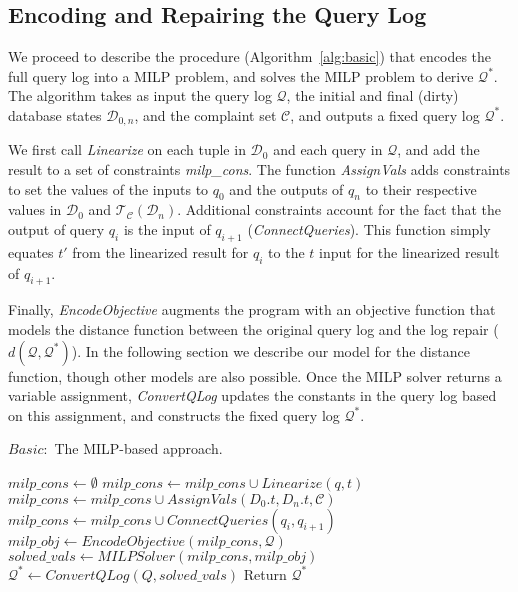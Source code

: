 \subsection{Encoding and Repairing the Query Log}
\label{sec:milp}

We proceed to describe the procedure (Algorithm~\ref{alg:basic}) that encodes 
the full query log into a MILP problem, and solves the MILP problem to derive $\mathcal{Q}^*$.
The algorithm takes as input the query log $\mathcal{Q}$, 
the initial and final (dirty) database states 
$\mathcal{D}_{0, n}$, and the complaint set $\mathcal{C}$, and outputs a fixed query 
log $\mathcal{Q}^*$.  

We first call \textit{Linearize} on each tuple in $\mathcal{D}_0$ and
each query in $\mathcal{Q}$, and add the result to a set of
constraints \textit{milp\_cons}. The function \textit{AssignVals} adds
constraints to set the values of the inputs to $q_0$ and the outputs
of $q_n$ to their respective values in $\mathcal{D}_0$ and
$\mathcal{T}_\mathcal{C}(\mathcal{D}_n)$. Additional constraints
account for the fact that the output of query $q_i$ is the input of
$q_{i+1}$ (\textit{ConnectQueries}). This function simply equates $t'$
from the linearized result for $q_i$ to the $t$ input for the
linearized result of $q_{i+1}$.

Finally, \emph{EncodeObjective} augments the program with an objective
function that models the distance function between the original query
log and the log repair ($d(\mathcal{Q},\mathcal{Q}^*)$). In the
following section we describe our model for the distance function,
though other models are also possible. Once the MILP solver returns a
variable assignment, \textit{ConvertQLog} updates the constants in the
query log based on this assignment, and constructs the fixed query log
$\mathcal{Q}^*$.





\begin{algorithm}[t]
\caption{$Basic:$ The MILP-based approach.}
\label{alg:basic}
\scriptsize
\begin{algorithmic}[1]
\STATE $milp\_cons \leftarrow \emptyset$
\STATE $milp\_cons \leftarrow milp\_cons \cup Linearize(q, t)$
\ENDFOR
\STATE $milp\_cons \leftarrow milp\_cons \cup AssignVals(D_0.t, D_n.t, \mathcal{C})$
\STATE $milp\_cons \leftarrow milp\_cons \cup ConnectQueries(q_i, q_{i+1})$
\ENDFOR
\ENDFOR 
\STATE $milp\_obj \leftarrow EncodeObjective(milp\_cons, \mathcal{Q})$
\STATE $solved\_vals \leftarrow MILPSolver(milp\_cons, milp\_obj)$
\STATE $\mathcal{Q}^* \leftarrow ConvertQLog(Q, solved\_vals)$
\STATE Return $\mathcal{Q}^*$
\end{algorithmic}
\end{algorithm}



















